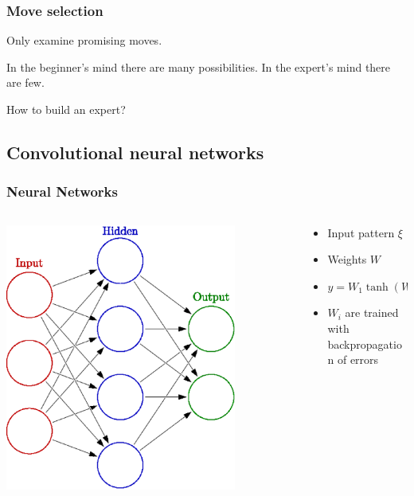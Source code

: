 \documentclass{beamer}
\begin{document}
\begin{frame}
  \frametitle{Move selection}
  Only examine promising moves.
  \begin{tcolorbox}
    In the beginner's mind there are many possibilities. In the expert's mind there are few.
  \end{tcolorbox}
  How to build an expert?
\end{frame}



\subsection{Convolutional neural networks}

\begin{frame}
  \frametitle{Neural Networks}
  \begin{columns}
    \begin{column}{0.5\textwidth}
      \includegraphics[width=0.8\textwidth]{neural_network}
    \end{column}
    \begin{column}{0.5\textwidth}
      \begin{itemize}
      \item Input pattern $\xi$
      \item Weights $W$
      \item $y = W_1 \tanh (W_0 \xi) $
      \item $W_i$ are trained with backpropagation of errors
      \end{itemize}
    \end{column}
  \end{columns}
\end{frame}
\end{document}
